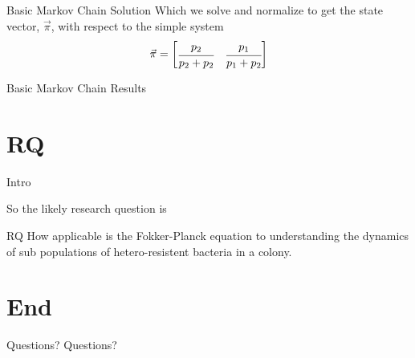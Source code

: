 \documentclass[aspectratio=169]{RUCPresentation}
\begin{document}
\begin{frame}{Basic Markov Chain Solution}
Which we solve and normalize to get the state vector, \(\vec{\pi}\),
with respect to the simple system
\begin{equation*}
    \vec{\pi}
    =
    \left[
        \begin{matrix}
            \cfrac{p_2}{p_2 + p_2} & \cfrac{p_1}{p_1 + p_2}
        \end{matrix}
    \right] 
\end{equation*}
\end{frame}

\begin{frame}{Basic Markov Chain Results}


\end{frame}

\section{RQ}
\begin{frame}{Intro}

    So the likely research question is
    \begin{block}{RQ}
        How applicable is the Fokker-Planck equation to understanding the dynamics
        of sub populations of hetero-resistent bacteria in a colony.
    \end{block}

\end{frame}


\section{End}
\begin{frame}{Questions?}
    \large Questions?
\end{frame}
\end{document}
